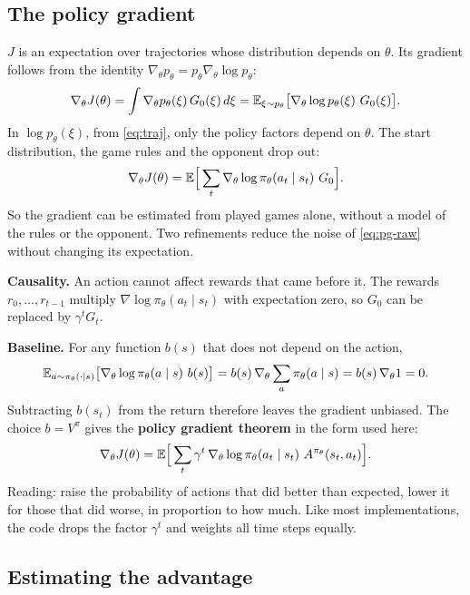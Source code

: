 \subsection{The policy gradient}\label{sec:fp-pg}

$J$ is an expectation over trajectories whose distribution depends on $\theta$. Its gradient follows from the
identity $\nabla_\theta p_\theta = p_\theta \nabla_\theta \log p_\theta$:
\[
\nabla_\theta J(\theta) = \int \nabla_\theta p_\theta(\xi)\, G_0(\xi)\, d\xi = \mathbb{E}_{\xi \sim p_\theta}\big[\nabla_\theta \log p_\theta(\xi)\ G_0(\xi)\big].
\]
In $\log p_\theta(\xi)$, from \eqref{eq:traj}, only the policy factors depend on $\theta$. The start
distribution, the game rules and the opponent drop out:
\begin{equation}\label{eq:pg-raw}
\nabla_\theta J(\theta) = \mathbb{E}\Big[\sum_{t} \nabla_\theta \log \pi_\theta(a_t \mid s_t)\ G_0\Big].
\end{equation}
So the gradient can be estimated from played games alone, without a model of the rules or the opponent.
Two refinements reduce the noise of \eqref{eq:pg-raw} without changing its expectation.

\textbf{Causality.} An action cannot affect rewards that came before it. The rewards $r_0, \dots, r_{t-1}$
multiply $\nabla \log \pi_\theta(a_t \mid s_t)$ with expectation zero, so $G_0$ can be replaced by
$\gamma^t G_t$.

\textbf{Baseline.} For any function $b(s)$ that does not depend on the action,
\[
\mathbb{E}_{a \sim \pi_\theta(\cdot \mid s)}\big[\nabla_\theta \log \pi_\theta(a \mid s)\ b(s)\big]
 = b(s)\, \nabla_\theta \sum_{a} \pi_\theta(a \mid s) = b(s)\, \nabla_\theta 1 = 0 .
\]
Subtracting $b(s_t)$ from the return therefore leaves the gradient unbiased. The choice $b = V^\pi$ gives the
\textbf{policy gradient theorem} in the form used here:
\begin{equation}\label{eq:pg}
\nabla_\theta J(\theta) = \mathbb{E}\Big[\sum_{t} \gamma^t\, \nabla_\theta \log \pi_\theta(a_t \mid s_t)\ A^{\pi_\theta}(s_t, a_t)\Big].
\end{equation}
Reading: raise the probability of actions that did better than expected, lower it for those that did
worse, in proportion to how much. Like most implementations, the code drops the factor $\gamma^t$ and
weights all time steps equally.

\subsection{Estimating the advantage}\label{sec:fp-gae}

